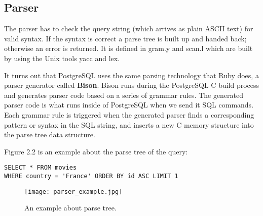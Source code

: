\subsection{Parser}
\begin{flushleft}
{\justify
The parser \cite{Flow of a select statement} has to check the query string (which arrives as plain ASCII text) for valid syntax. If the syntax is correct a parse tree is built up and handed back; otherwise an error is returned. It is defined in gram.y and scan.l which are built by using the Unix tools yacc and lex.
\par}
\vspace{0.5cm}
{\justify
It turns out that PostgreSQL uses the same parsing technology that Ruby does, a parser generator called {\bfseries Bison}. Bison runs during the PostgreSQL C build process and generates parser code based on a series of grammar rules. The generated parser code is what runs inside of PostgreSQL when we send it SQL commands. Each grammar rule is triggered when the generated parser finds a corresponding pattern or syntax in the SQL string, and inserts a new C memory structure into the parse tree data structure.
\par }
\vspace{0.5cm}
{\justify
Figure 2.2 is an example about the parse tree of the query: \\
\newpage\begin{verbatim}
SELECT * FROM movies 
WHERE country = 'France' ORDER BY id ASC LIMIT 1
\end{verbatim}

\begin{figure}[H]
\centering
\texttt{[image: parser\_example.jpg]}
\caption{An example about parse tree.}
\end{figure}
}
\end{flushleft}
